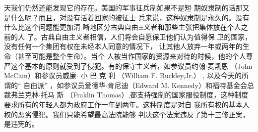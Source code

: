 \begin{paracol}{2}
天我们仍然还能发现它的存在。美国的军事征兵制如果不是短
期奴隶制的话那又是什么呢？而且，对没有活着回家的被征士
兵来说，这种奴隶制是永久的。没有什么比这个问题能更加清
晰地区分古典自由±义者和那些主张把集体放在个人之前的人
了。古典自由主义者相信，人们将会自愿保卫他们认为值得保
卫的国家，没有任何一个集团有权在未经本人同意的情况下，
让其他人放弃一年或两年的生命（甚至可能是整个生命）。当个
人被当作国家的资源来对待的时候，他的个人尊严这个基本的原则就受到了侵犯。有的保守主义者，如参议员约翰$\cdot$麦凯恩
（John McCain）和参议员威廉$\cdot$ 小 巴 克 利 （William  F. Buckley,Jr.） , 以及今天的所谓的“ 自由派” ，如参议员爱德华$\cdot$肯尼迪（Edward M. Kennedy）和福特基金会总裁弗兰克林$\cdot$托马
斯 （Fraklin  Thomas）,都支持强制的国家服役制度，这种制度
要求所有的年轻人都为政府工作一年到两年。这种制度是对自
我所有权的基本人权的恶劣侵犯。我们只能希望最高法院能够
判决这个法案违反了第十三修正案，是违宪的。


\end{paracol}
